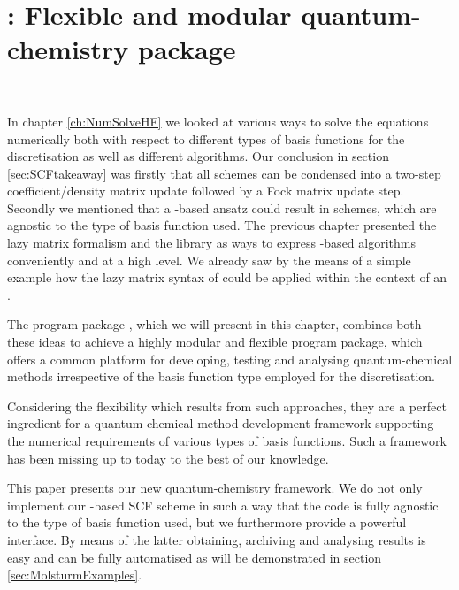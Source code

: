 \chapter{\molsturm: Flexible and modular quantum-chemistry package}
\label{ch:Molsturm}
 \\

\noindent
In chapter \vref{ch:NumSolveHF} we looked at various ways to solve the
\HF equations numerically both with respect to different types of basis functions
for the discretisation as well as different \SCF algorithms.
Our conclusion in section
\ref{sec:SCFtakeaway}
was firstly that all \SCF schemes can be condensed into a two-step
coefficient/density matrix update followed by a Fock matrix update step.
Secondly we mentioned that a \contraction-based ansatz could result in \SCF schemes,
which are agnostic to the type of basis function used.
The previous chapter presented the lazy matrix formalism
and the \lazyten library as ways to express
\contraction-based algorithms conveniently and at a high level.
We already saw by the means of a simple example how
the lazy matrix syntax of \lazyten could be applied within the context
of an \SCF.

The program package \molsturm, which we will present in this chapter,
combines both these ideas 
to achieve a highly modular and flexible program package,
which offers a common platform for developing, testing and analysing
quantum-chemical methods irrespective of the basis function type employed for
the discretisation.




Considering the flexibility which results from such approaches,
they are a perfect ingredient for
a quantum-chemical method development framework
supporting the numerical requirements of various types of basis functions.
Such a framework has been missing up to today to the best of our knowledge.

This paper presents our new \molsturm quantum-chemistry framework.
We do not only implement our \contraction-based SCF scheme
in such a way that the code is fully agnostic to the type of basis function used,
but we furthermore provide a powerful \python interface.
By means of the latter obtaining, archiving and analysing results
is easy and can be fully automatised
as will be demonstrated in section \ref{sec:MolsturmExamples}.

